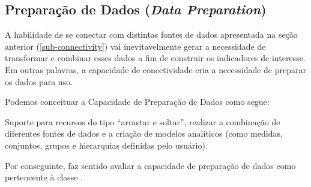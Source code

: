\subsection{Preparação de Dados (\emph{Data Preparation})}
\label{sub-preparation}

A habilidade de se conectar com distintas fontes de dados apresentada na seção anterior (\ref{sub-connectivity}) vai inevitavelmente gerar a necessidade de transformar e combinar esses dados a fim de construir os indicadores de interesse. Em outras palavras, a capacidade de conectividade cria a necessidade de preparar os dados para uso. 

Podemos conceituar a Capacidade de Preparação de Dados como segue:

\begin{definition}
Suporte para recursos do tipo ``arrastar e soltar'', realizar a combinação de diferentes fontes de dados e a criação de modelos analíticos (como medidas, conjuntos, grupos e hierarquias definidas pelo usuário).
\end{definition}

Por conseguinte, faz sentido avaliar a capacidade de preparação de dados como pertencente à classe \MUST.

